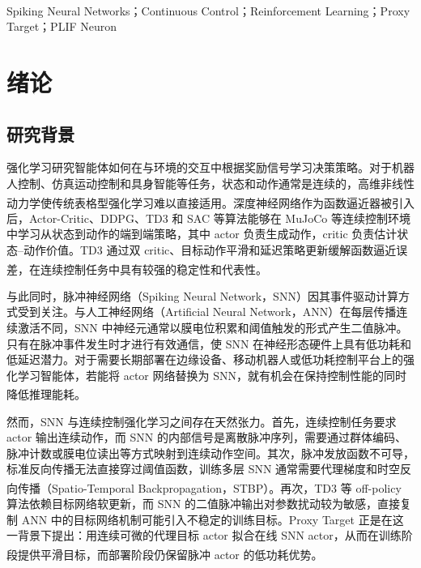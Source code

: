 \documentclass[UTF8,zihao=-4,oneside,openany]{ctexbook}
\let\oldcite\cite
\renewcommand{\cite}[1]{\textsuperscript{\oldcite{#1}}}
\begin{document}
\\
Spiking Neural Networks；Continuous Control；Reinforcement Learning；Proxy Target；PLIF Neuron

\clearpage
\tableofcontents

\mainmatter
{}

\chapter{绪论}

\section{研究背景}
强化学习研究智能体如何在与环境的交互中根据奖励信号学习决策策略。对于机器人控制、仿真运动控制和具身智能等任务，状态和动作通常是连续的，高维非线性动力学使传统表格型强化学习难以直接适用\cite{kober2013rlrobotics}。深度神经网络作为函数逼近器被引入后，Actor-Critic、DDPG、TD3 和 SAC 等算法能够在 MuJoCo 等连续控制环境中学习从状态到动作的端到端策略，其中 actor 负责生成动作，critic 负责估计状态--动作价值。TD3 通过双 critic、目标动作平滑和延迟策略更新缓解函数逼近误差，在连续控制任务中具有较强的稳定性和代表性\cite{mnih2015dqn,lillicrap2016ddpg,fujimoto2018td3,haarnoja2018sac}。

与此同时，脉冲神经网络（Spiking Neural Network，SNN）因其事件驱动计算方式受到关注。与人工神经网络（Artificial Neural Network，ANN）在每层传播连续激活不同，SNN 中神经元通常以膜电位积累和阈值触发的形式产生二值脉冲。只有在脉冲事件发生时才进行有效通信，使 SNN 在神经形态硬件上具有低功耗和低延迟潜力。对于需要长期部署在边缘设备、移动机器人或低功耗控制平台上的强化学习智能体，若能将 actor 网络替换为 SNN，就有机会在保持控制性能的同时降低推理能耗\cite{maass1997third,furber2014spinnaker,davies2018loihi,roy2019neuromorphic,tang2020popsan,chen2024fully}。

然而，SNN 与连续控制强化学习之间存在天然张力。首先，连续控制任务要求 actor 输出连续动作，而 SNN 的内部信号是离散脉冲序列，需要通过群体编码、脉冲计数或膜电位读出等方式映射到连续动作空间。其次，脉冲发放函数不可导，标准反向传播无法直接穿过阈值函数，训练多层 SNN 通常需要代理梯度和时空反向传播（Spatio-Temporal Backpropagation，STBP）\cite{lee2016backprop,wu2018stbp,neftci2019surrogate}。再次，TD3 等 off-policy 算法依赖目标网络软更新，而 SNN 的二值脉冲输出对参数扰动较为敏感，直接复制 ANN 中的目标网络机制可能引入不稳定的训练目标。Proxy Target 正是在这一背景下提出：用连续可微的代理目标 actor 拟合在线 SNN actor，从而在训练阶段提供平滑目标，而部署阶段仍保留脉冲 actor 的低功耗优势\cite{xu2025proxy}。
\end{document}
